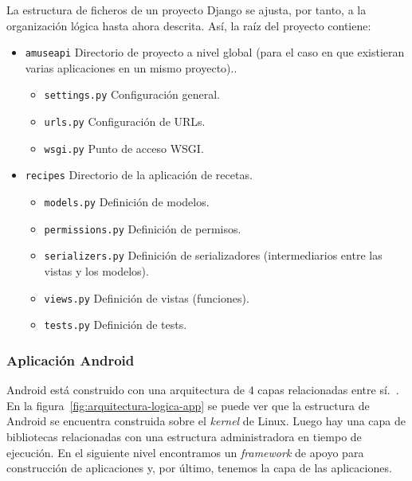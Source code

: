 La estructura de ficheros de un proyecto Django se ajusta, por tanto, a la
organización lógica hasta ahora descrita. Así, la raíz del proyecto contiene:
\begin{itemize}
\item \texttt{amuseapi} Directorio de proyecto a nivel global (para el caso en
  que existieran varias aplicaciones en un mismo proyecto)..
  \begin{itemize}
  \item \texttt{settings.py} Configuración general.
  \item \texttt{urls.py} Configuración de URLs.
  \item \texttt{wsgi.py} Punto de acceso WSGI.
  \end{itemize}
\item \texttt{recipes} Directorio de la aplicación de recetas.
  \begin{itemize}
  \item \texttt{models.py} Definición de modelos.
  \item \texttt{permissions.py} Definición de permisos.
  \item \texttt{serializers.py} Definición de serializadores (intermediarios
    entre las vistas y los modelos).
  \item \texttt{views.py} Definición de vistas (funciones).
  \item \texttt{tests.py} Definición de tests.
  \end{itemize}
\end{itemize}



\subsubsection{Aplicación Android}
\label{subsec:arquitectura-logica-android}

Android está construido con una arquitectura de 4 capas relacionadas entre
sí.~\cite{learning-android}. En la figura~\ref{fig:arquitectura-logica-app} se
puede ver que la estructura de Android se encuentra construida sobre el
\textit{kernel} de Linux. Luego hay una capa de bibliotecas relacionadas con una
estructura administradora en tiempo de ejecución. En el siguiente nivel
encontramos un \textit{framework} de apoyo para construcción de aplicaciones y,
por último, tenemos la capa de las aplicaciones.

